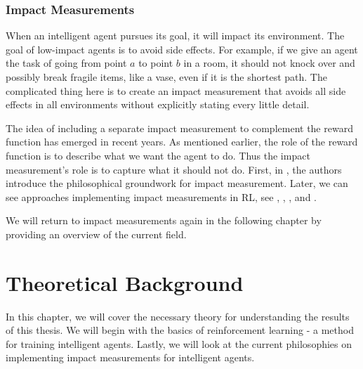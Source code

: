 \documentclass[12pt,A4]{report}
\theoremstyle{definition}
\begin{document}

\subsection{Impact Measurements}

When an intelligent agent pursues its goal, it will impact its environment. The goal of low-impact agents is to avoid side effects. For example, if we give an agent the task of going from point $a$ to point $b$ in a room, it should not knock over and possibly break fragile items, like a vase, even if it is the shortest path. The complicated thing here is to create an impact measurement that avoids all side effects in all environments without explicitly stating every little detail.

The idea of including a separate impact measurement to complement the reward function has emerged in recent years. As mentioned earlier, the role of the reward function is to describe what we want the agent to do. Thus the impact measurement's role is to capture what it should not do. First, in \citet{ArmstrongLevinstein}, the authors introduce the philosophical groundwork for impact measurement. Later, we can see approaches implementing impact measurements in RL, see \citet{Eysenbach}, \citet{Krakovna19}, \citet{Turner19}, and \citet{Krakovna20}.

We will return to impact measurements again in the following chapter by providing an overview of the current field. 


 


\chapter{Theoretical Background}
In this chapter, we will cover the necessary theory for understanding the results of this thesis. We will begin with the basics of reinforcement learning - a method for training intelligent agents. Lastly, we will look at the current philosophies on implementing impact measurements for intelligent agents. 
\end{document}

